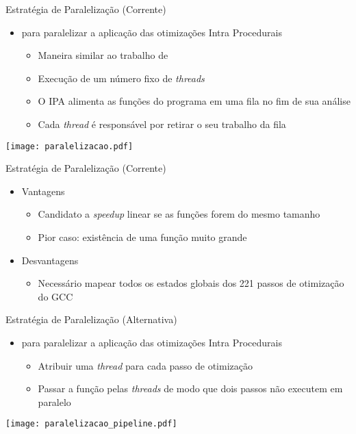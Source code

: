 \begin{frame}{Estratégia de Paralelização (Corrente)}
    \begin{itemize}
        \item {\color{blue}{Estratégia corrente}} para paralelizar a aplicação das otimizações Intra Procedurais
            \begin{itemize}
                \item Maneira similar ao trabalho de \cite{wortman1992}
                \item Execução de um número fixo de \textit{threads}
                \item O IPA alimenta as funções do programa em uma fila no fim de sua análise
                \item Cada \textit{thread} é responsável por retirar o seu trabalho da fila
    \end{itemize}
\end{itemize}

 \centering
 \texttt{[image: paralelizacao.pdf]}
\end{frame}

\begin{frame}{Estratégia de Paralelização (Corrente)}
    \begin{itemize}
        \item Vantagens
            \begin{itemize}
                \item Candidato a \textit{speedup} linear se as funções forem do mesmo tamanho
                \item Pior caso: existência de uma função muito grande
            \end{itemize}
        \item Desvantagens
            \begin{itemize}
                \item Necessário mapear todos os estados globais dos 221 passos de otimização do GCC
            \end{itemize}
    \end{itemize}
\end{frame}

\begin{frame}{Estratégia de Paralelização (Alternativa)}
    \begin{itemize}
        \item {\color{blue}{Estratégia alternativa}} para paralelizar a aplicação das otimizações Intra Procedurais
            \begin{itemize}
                \item Atribuir uma \textit{thread} para cada passo de otimização
                \item Passar a função pelas \textit{threads} de modo que dois passos não executem em paralelo
            \end{itemize}
    \end{itemize}
 \centering
 \texttt{[image: paralelizacao\_pipeline.pdf]}
\end{frame}

